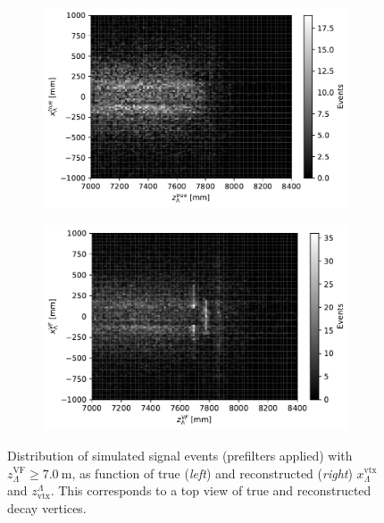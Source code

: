 \begin{figure}[t]
	\centering
	\begin{subfigure}{.45\textwidth}
		\includegraphics[height=.2\textheight]{graphics/04-event_selection/Lambda_endvertex_z_vs_x_true.pdf}
		\caption{}
		\label{fig:4:lz_vertex_peaks_true}
	\end{subfigure}
	\begin{subfigure}{.45\textwidth}
		\includegraphics[height=.2\textheight]{graphics/04-event_selection/Lambda_endvertex_z_vs_x.pdf}
		\caption{}
		\label{fig:4:lz_vertex_peaks_reco}
	\end{subfigure}
	\caption{Distribution of simulated \demonstratorshort signal events (prefilters applied) with $z_\Lambda^\text{VF} \geq \SI{7.0}{\meter}$, as function of true (\textit{left}) and reconstructed (\textit{right}) $x_\Lambda^\text{vtx}$ and $z_\text{vtx}^\Lambda$. This corresponds to a top view of true and reconstructed \lz decay vertices.}
	\label{fig:4:lz_vertex_peaks}
\end{figure}

